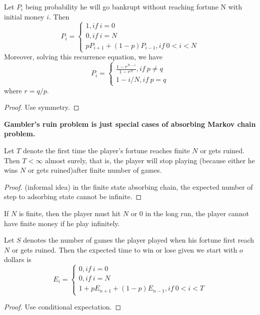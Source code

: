 \begin{refsection}
\begin{corollary}
	Let $P_i$ being probability he will go bankrupt without reaching fortune N with initial money $i$. Then
	$$P_i = \begin{cases}
	1, if ~ i = 0\\
	0, if ~ i = N\\
	pP_{i+1} + (1-p)P_{i-1}, if ~ 0 < i < N
	\end{cases}$$
	Moreover, solving this recurrence equation, we have
	$$P_i = \begin{cases}
	\frac{1 - r^{N-i}}{1 - r^N}, if ~ p\neq q\\
	1-i/N, if ~ p = q
	\end{cases}$$
	where $r = q/p$. 
\end{corollary}
\begin{proof}
	Use symmetry.
\end{proof}

\begin{remark}
	\textbf{Gambler's ruin problem is just special cases of absorbing Markov chain problem.}
\end{remark}





\begin{lemma}
	Let $T$ denote the first time the player's fortune reaches finite $N$ or gets ruined. Then $T < \infty$ almost surely, that is, the player will stop playing (because either he wins $N$ or gets ruined)after finite number of games. 
\end{lemma}
\begin{proof}
	(informal idea) in the finite state absorbing chain, the expected number of step to adsorbing state cannot be infinite.	
\end{proof}

\begin{remark}
	If $N$ is finite, then the player must hit $N$ or 0 in the long run, the player cannot have finite money if he play infinitely.
\end{remark}


\begin{lemma}
	Let $S$ denotes the number of games the player played when his fortune first reach $N$ or gets ruined. Then the expected time to win or lose given we start with $o$ dollars is
	$$E_i = \begin{cases}
	0, if ~ i=0\\
	0, if ~ i=N\\
	1 + pE_{n+1} + (1-p)E_{n-1}, if ~ 0 < i < T
	\end{cases}$$	
\end{lemma}
\begin{proof}
Use conditional expectation.	
\end{proof}


\end{refsection}
